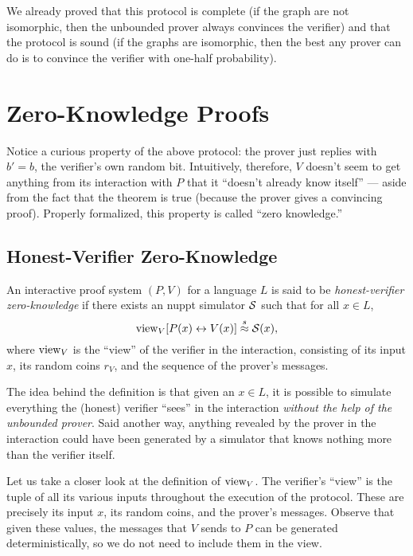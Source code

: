 \documentclass[11pt]{article}
\begin{document}
We already proved that this protocol is complete (if the graph are not
isomorphic, then the unbounded prover always convinces the verifier)
and that the protocol is sound (if the graphs are isomorphic, then the
best any prover can do is to convince the verifier with one-half
probability).

\section{Zero-Knowledge Proofs}
\label{sec:zero-knowl-proofs}

Notice a curious property of the above protocol: the prover just
replies with $b' = b$, the verifier's own random bit.  Intuitively,
therefore, $V$ doesn't seem to get anything from its interaction with
$P$ that it ``doesn't already know itself'' --- aside from the fact
that the theorem is true (because the prover gives a convincing
proof).  Properly formalized, this property is called ``zero
knowledge.''

\subsection{Honest-Verifier Zero-Knowledge}
\label{sec:honest-verifier-zero}

\begin{definition}
  \label{def:hvzk}
  An interactive proof system $(P,V)$ for a language $L$ is said to be
  \emph{honest-verifier zero-knowledge} if there exists an nuppt
  simulator $\mathcal{S}$ such that for all $x \in L$, \[ \text{view}_{V}[ P(x)
  \leftrightarrow V(x) ] \stackrel{s}{\approx} \mathcal{S}(x), \] where $\text{view}_{V}$ is the
  ``view'' of the verifier in the interaction, consisting of its input
  $x$, its random coins $r_V$, and the sequence of the prover's
  messages.
\end{definition}

The idea behind the definition is that given an $x \in L$, it is
possible to simulate everything the (honest) verifier ``sees'' in the
interaction \emph{without the help of the unbounded prover}.  Said
another way, anything revealed by the prover in the interaction could
have been generated by a simulator that knows nothing more than the
verifier itself.

Let us take a closer look at the definition of $\text{view}_V$.  The
verifier's ``view'' is the tuple of all its various inputs throughout
the execution of the protocol.  These are precisely its input $x$, its
random coins, and the prover's messages.  Observe that given these
values, the messages that $V$ sends to $P$ can be generated
deterministically, so we do not need to include them in the view.
\end{document}
